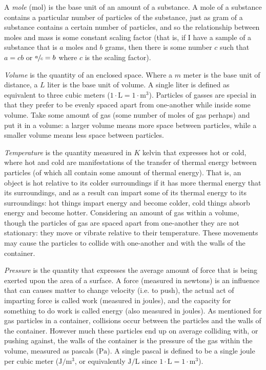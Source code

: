 \documentclass{article}
\begin{document}
\begin{definition*}
    A \emph{mole} (mol) is the base unit of an amount of a substance. A mole of a substance
    contains a particular number of particles of the substance, just as gram of a substance
    contains a certain number of particles, and so the relationship between moles and mass is
    some constant scaling factor (that is, if I have a sample of a substance that is $a$ moles
    and $b$ grams, then there is some number $c$ such that $a=cb$ or $\sfrac{a}{c}=b$ where $c$
    is the scaling factor).

    \emph{Volume} is the quantity of an enclosed space. Where a $m$ meter is the base unit of
    distance, a $L$ liter is the base unit of volume. A single liter is defined as equivalent to
    three cubic meters ($1\cdot\text{L}=1\cdot\text{m}^3$). Particles of gasses are special in
    that they prefer to be evenly spaced apart from one-another while inside some volume. Take
    some amount of gas (some number of moles of gas perhaps) and put it in a volume: a larger
    volume means more space between particles, while a smaller volume means less space between
    particles.

    \emph{Temperature} is the quantity measured in $K$ kelvin that expresses hot or cold, where
    hot and cold are manifestations of the transfer of thermal energy between particles (of
    which all contain some amount of thermal energy). That is, an object is hot relative to its
    colder surroundings if it has more thermal energy that its surroundings, and as a result can
    impart some of its thermal energy to its surroundings: hot things impart energy and become
    colder, cold things absorb energy and become hotter. Considering an amount of gas within a
    volume, though the particles of gas are spaced apart from one-another they are not
    stationary: they move or vibrate relative to their temperature. These movements may cause
    the particles to collide with one-another and with the walls of the container.

    \emph{Pressure} is the quantity that expresses the average amount of force that is being
    exerted upon the area of a surface. A force (measured in newtons) is an influence that can
    causes matter to change velocity (i.e. to push), the actual act of imparting force is called
    work (measured in joules), and the capacity for something to do work is called energy (also
    measured in joules). As mentioned for gas particles in a container, collisions occur between
    the particles and the walls of the container. However much these particles end up on average
    colliding with, or pushing against, the walls of the container is the pressure of the gas
    within the volume, measured as pascals ($\text{Pa}$). A single pascal is defined to be a
    single joule per cubic meter ($\text{J}/\text{m}^3$, or equivalently $\text{J}/\text{L}$
    since $1\cdot\text{L}=1\cdot\text{m}^3$).
\end{definition*}
\end{document}

